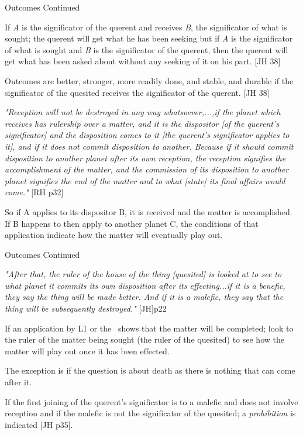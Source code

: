 \begin{frame}[t]{Outcomes Continued}

If \textsl{A} is the significator of the querent and receives \textsl{B}, the significator of what is sought; the querent will get what he has been seeking but if \textsl{A} is the significator of what is sought and \textsl{B} is the significator of the querent, then the querent will get what has been asked about without any seeking of it on his part. [JH 38]

Outcomes are better, stronger, more readily done, and stable, and durable if the significator of the quesited receives the significator of the querent. [JH 38]

\begin{block}{}
\textsl{"Reception will not be destroyed in any way whatsoever,...,if the planet which receives has rulership over a matter, and it is the dispositor [of the querent's significator] and the disposition comes to it [the querent's significator applies to it], and if it does not commit disposition to another. Because if it should commit disposition to another planet after its own reception, the reception signifies the accomplishment of the matter, and the commission of its disposition to another planet signifies the end of the matter and to what [state] its final affairs would come."} [RH p32]
\end{block}
So if A applies to its dispositor B, it is received and the matter is accomplished. If B happens to then apply to another planet C, the conditions of that application indicate how the matter will eventually play out.
\end{frame}
\begin{frame}[t]{Outcomes Continued}

\begin{block}{}
\textsl{"After that, the ruler of the house of the thing [quesited] is looked at to see to what planet it commits its own disposition after its effecting...if it is a benefic, they say the thing will be made better. And if it is a malefic, they say that the thing will be subsequently destroyed."} [JH]p22
\end{block}
If an application by L1 or the \Moon\ shows that the matter will be completed; look to the ruler of the matter being sought (the ruler of the quesited) to see how the matter will play out once it has been effected.

The exception is if the question is about death as there is nothing that can come after it.

If the first joining of the querent's significator is to a malefic and does not involve reception and if the malefic is not the significator of the quesited;  a \textsl{prohibition} is indicated [JH p35].

\end{frame}
